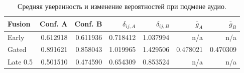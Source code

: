 \begin{table}[H]\centering\footnotesize
\setlength{\tabcolsep}{4pt}
\caption{Средняя уверенность и изменение вероятностей при подмене аудио.}\label{tab:confstats}
\begin{tabular}{lrrrrrr}
\toprule
Fusion & Conf. A & Conf. B & $\delta_{ij,A}$ & $\delta_{ij,B}$ & $\bar g_A$ & $\bar g_B$ \\
\midrule
Early & 0.612918 & 0.611936 & 0.718412 & 1.037994 & n/a & n/a \\
Gated & 0.891621 & 0.858043 & 1.019965 & 1.429506 & 0.478021 & 0.470309 \\
Late 0.5 & 0.501510 & 0.474590 & 0.654309 & 0.853524 & n/a & n/a \\
\bottomrule
\end{tabular}
\end{table}
